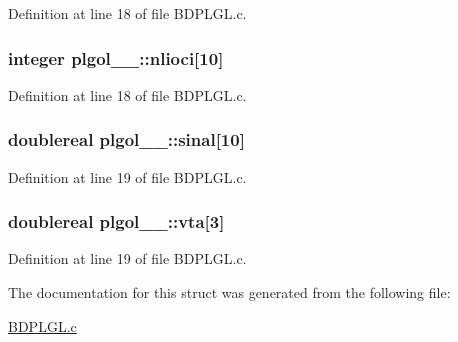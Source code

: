 Definition at line 18 of file B\+D\+P\+L\+G\+L.\+c.

\subsubsection[{\texorpdfstring{nlioci}{nlioci}}]{\setlength{\rightskip}{0pt plus 5cm}integer plgol\+\_\+\_\+\+::nlioci\mbox{[}10\mbox{]}}\hypertarget{structplgol__1___a2e768cef3d4a9a2ac95cf6311c633b37}{}\label{structplgol__1___a2e768cef3d4a9a2ac95cf6311c633b37}


Definition at line 18 of file B\+D\+P\+L\+G\+L.\+c.

\subsubsection[{\texorpdfstring{sinal}{sinal}}]{\setlength{\rightskip}{0pt plus 5cm}doublereal plgol\+\_\+\_\+\+::sinal\mbox{[}10\mbox{]}}\hypertarget{structplgol__1___a024fcf03579dc1c8cd13aa8f83728a12}{}\label{structplgol__1___a024fcf03579dc1c8cd13aa8f83728a12}


Definition at line 19 of file B\+D\+P\+L\+G\+L.\+c.

\subsubsection[{\texorpdfstring{vta}{vta}}]{\setlength{\rightskip}{0pt plus 5cm}doublereal plgol\+\_\+\_\+\+::vta\mbox{[}3\mbox{]}}\hypertarget{structplgol__1___a7eefeebb364ef819e1f61e128420f96f}{}\label{structplgol__1___a7eefeebb364ef819e1f61e128420f96f}


Definition at line 19 of file B\+D\+P\+L\+G\+L.\+c.



The documentation for this struct was generated from the following file\+:\begin{DoxyCompactItemize}
\item 
\hyperlink{BDPLGL_8c}{B\+D\+P\+L\+G\+L.\+c}\end{DoxyCompactItemize}
